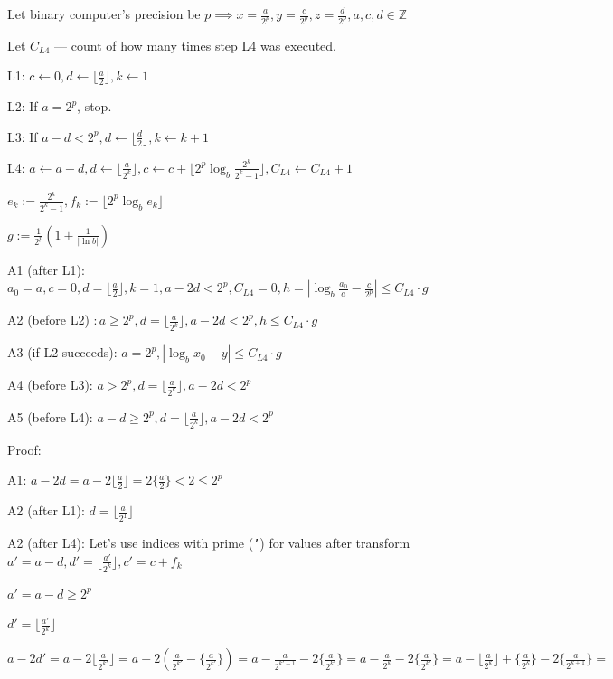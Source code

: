 \documentclass{article}
\begin{document}
Let binary computer's precision be \( p \implies x = \frac{a}{2^{p}}, y = \frac{c}{2^{p}}, z = \frac{d}{2^{p}}, a,c,d \in \mathbb{Z} \)

Let \( C_{L4} \) --- count of how many times step L4 was executed.

L1: \( c \leftarrow 0, d \leftarrow \lfloor \frac{a}{2} \rfloor, k \leftarrow 1 \)

L2: If \( a = 2^{p} \), stop.

L3: If \( a - d < 2^{p}, d \leftarrow \lfloor\frac{d}{2}\rfloor, k \leftarrow k + 1 \)

L4: \( a \leftarrow a - d, d \leftarrow \lfloor\frac{a}{2^{k}}\rfloor, c \leftarrow c + \lfloor2^{p}\log_{b}\frac{2^{k}}{2^{k}-1}\rfloor, C_{L4} \leftarrow C_{L4} + 1 \)

\( e_{k} := \frac{2^{k}}{2^{k}-1}, f_{k} := \lfloor2^{p}\log_{b}e_{k}\rfloor \)

\( g := \frac{1}{2^{p}}(1 + \frac{1}{|\ln b|}) \)

A1 (after L1): \( a_{0} = a, c = 0, d = \lfloor\frac{a}{2}\rfloor, k = 1, a - 2d < 2^{p}, C_{L4} = 0, h = |\log_{b}\frac{a_{0}}{a}-\frac{c}{2^{p}}| \leq C_{L4} \cdot g \)

A2 (before L2) \( : a \geq 2^{p}, d = \lfloor\frac{a}{2^{k}}\rfloor, a - 2d < 2^{p}, h \leq C_{L4} \cdot g \)

A3 (if L2 succeeds): \( a = 2^{p}, |\log_b{x_{0}} - y| \leq C_{L4} \cdot g \)

A4 (before L3): \( a > 2^{p}, d = \lfloor\frac{a}{2^{k}}\rfloor, a - 2d < 2^{p} \)

A5 (before L4): \( a - d \geq 2^{p}, d = \lfloor\frac{a}{2^{k}}\rfloor, a - 2d < 2^{p} \)

Proof:

A1: \( a-2d=a-2\lfloor\frac{a}{2}\rfloor = 2 \{\frac{a}{2}\} < 2 \leq 2^{p} \)

A2 (after L1): \( d = \lfloor\frac{a}{2^{1}}\rfloor \)

A2 (after L4): Let's use indices with prime (\texttt{'}) for values after transform \( a'=a-d, d'=\lfloor\frac{a'}{2^{k}}\rfloor, c'=c + f_{k} \)

\( a'=a-d \geq 2^{p} \)

\( d'=\lfloor\frac{a'}{2^{k}}\rfloor \)

\( a-2d'=a-2\lfloor\frac{a}{2^{k'}}\rfloor = a-2(\frac{a}{2^{k'}} - \{\frac{a}{2^{k'}}\}) = a-\frac{a}{2^{k'-1}} - 2\{\frac{a}{2^{k'}}\} = a-\frac{a}{2^{k}} - 2\{\frac{a}{2^{k'}}\} = a - \lfloor\frac{a}{2^{k}}\rfloor + \{\frac{a}{2^{k}}\} - 2\{\frac{a}{2^{k+1}}\} = \)
\end{document}
